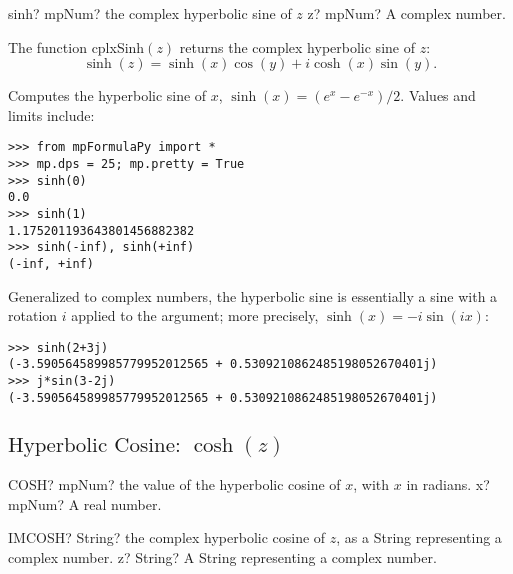\begin{mpFunctionsExtract}
	\mpFunctionOne
	{sinh? mpNum? the complex hyperbolic sine of $z$}
	{z? mpNum? A complex number.}
\end{mpFunctionsExtract}

\vspace{0.3cm}
The function \textsf{cplxSinh$(z)$} returns the complex hyperbolic sine of $z$: 
\begin{equation}
	\sinh(z) = \sinh(x) \cos(y) + i \cosh(x) \sin(y).
\end{equation}

Computes the hyperbolic sine of $x$, $\sinh(x) = (e^x-e^{-x})/2$. Values and limits include:

\begin{lstlisting}
>>> from mpFormulaPy import *
>>> mp.dps = 25; mp.pretty = True
>>> sinh(0)
0.0
>>> sinh(1)
1.175201193643801456882382
>>> sinh(-inf), sinh(+inf)
(-inf, +inf)
\end{lstlisting}

Generalized to complex numbers, the hyperbolic sine is essentially a sine with a rotation $i$ applied to the argument; more precisely, $\sinh(x) = -i \sin(ix)$: 

\begin{lstlisting}
>>> sinh(2+3j)
(-3.590564589985779952012565 + 0.5309210862485198052670401j)
>>> j*sin(3-2j)
(-3.590564589985779952012565 + 0.5309210862485198052670401j)
\end{lstlisting}




\newpage
\subsection{\texorpdfstring{$\text{Hyperbolic Cosine: }\cosh(z)$}{cosh}}

\begin{mpFunctionsExtract}
	\mpWorksheetFunctionOneNotImplemented
	{COSH? mpNum? the value of the hyperbolic cosine of $x$, with $x$ in radians.}
	{x? mpNum? A real number.}
\end{mpFunctionsExtract}

\vspace{0.6cm}
\begin{mpFunctionsExtract}
	\mpWorksheetFunctionOneNotImplemented
	{IMCOSH? String? the complex hyperbolic cosine of $z$, as a String representing a complex number.}
	{z? String? A String representing a complex number.}
\end{mpFunctionsExtract}



